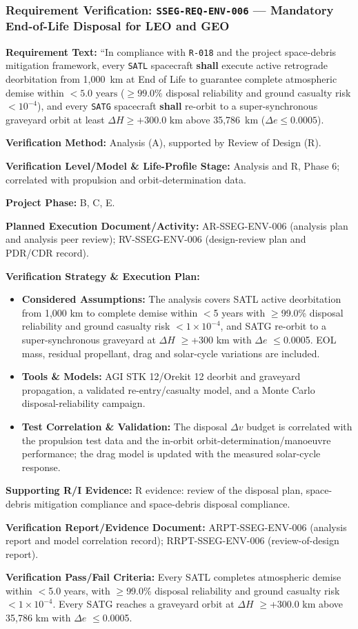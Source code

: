 \subsubsection{Requirement Verification: \texttt{SSEG-REQ-ENV-006} --- Mandatory End-of-Life Disposal for LEO and GEO}
\label{ver:SSEG-REQ-ENV-006}
\textbf{Requirement Text:} ``In compliance with \texttt{R-018} and the project space-debris mitigation framework, every \texttt{SATL} spacecraft \textbf{shall} execute active retrograde deorbitation from 1,000~km at End of Life to guarantee complete atmospheric demise within $< 5.0\text{ years}$ ($\ge 99.0\%$ disposal reliability and ground casualty risk $< 10^{-4}$), and every \texttt{SATG} spacecraft \textbf{shall} re-orbit to a super-synchronous graveyard orbit at least $\Delta H \ge +300.0\text{ km}$ above 35,786~km ($\Delta e \le 0.0005$).
\par\textbf{Verification Method:} Analysis (A), supported by Review of Design (R).
\par\textbf{Verification Level/Model \& Life-Profile Stage:} Analysis and R, Phase 6; correlated with propulsion and orbit-determination data.
\par\textbf{Project Phase:} B, C, E.
\par\textbf{Planned Execution Document/Activity:} AR-SSEG-ENV-006 (analysis plan and analysis peer review); RV-SSEG-ENV-006 (design-review plan and PDR/CDR record).
\par\textbf{Verification Strategy \& Execution Plan:}
\begin{itemize}
\item \textbf{Considered Assumptions:} The analysis covers SATL active deorbitation from 1,000 km to complete demise within $<$5 years with $\ge$99.0\% disposal reliability and ground casualty risk $<$$1\times10^{-4}$, and SATG re-orbit to a super-synchronous graveyard at $\Delta H$ $\ge$+300 km with $\Delta e$ $\le$0.0005. EOL mass, residual propellant, drag and solar-cycle variations are included.
\item \textbf{Tools \& Models:} AGI STK 12/Orekit 12 deorbit and graveyard propagation, a validated re-entry/casualty model, and a Monte Carlo disposal-reliability campaign.
\item \textbf{Test Correlation \& Validation:} The disposal $\Delta v$ budget is correlated with the propulsion test data and the in-orbit orbit-determination/manoeuvre performance; the drag model is updated with the measured solar-cycle response.
\end{itemize}
\par\textbf{Supporting R/I Evidence:} R evidence: review of the disposal plan, space-debris mitigation compliance and space-debris disposal compliance.
\par\textbf{Verification Report/Evidence Document:} ARPT-SSEG-ENV-006 (analysis report and model correlation record); RRPT-SSEG-ENV-006 (review-of-design report).
\par\textbf{Verification Pass/Fail Criteria:} Every SATL completes atmospheric demise within $<$5.0 years, with $\ge$99.0\% disposal reliability and ground casualty risk $<$$1\times10^{-4}$. Every SATG reaches a graveyard orbit at $\Delta H$ $\ge$+300.0 km above 35,786 km with $\Delta e$ $\le$0.0005.
\par\medskip
